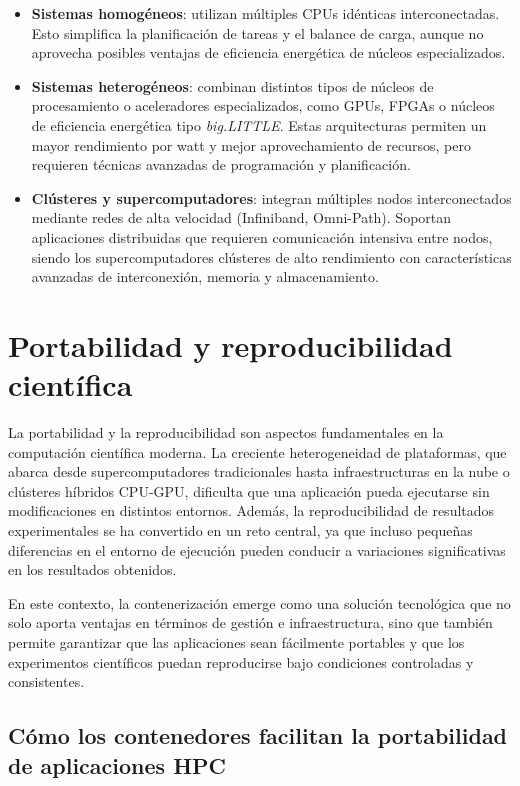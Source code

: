 \begin{itemize}
    \item \textbf{Sistemas homogéneos}: utilizan múltiples CPUs idénticas interconectadas. Esto simplifica la planificación de tareas y el balance de carga, aunque no aprovecha posibles ventajas de eficiencia energética de núcleos especializados.
    \item \textbf{Sistemas heterogéneos}: combinan distintos tipos de núcleos de procesamiento o aceleradores especializados, como GPUs, FPGAs o núcleos de eficiencia energética tipo \textit{big.LITTLE}. Estas arquitecturas permiten un mayor rendimiento por watt y mejor aprovechamiento de recursos, pero requieren técnicas avanzadas de programación y planificación.
    \item \textbf{Clústeres y supercomputadores}: integran múltiples nodos interconectados mediante redes de alta velocidad (Infiniband, Omni-Path). Soportan aplicaciones distribuidas que requieren comunicación intensiva entre nodos, siendo los supercomputadores clústeres de alto rendimiento con características avanzadas de interconexión, memoria y almacenamiento.
\end{itemize}

\section{Portabilidad y reproducibilidad científica}\label{sec:portabilidad_reproducibilidad}

La portabilidad y la reproducibilidad son aspectos fundamentales en la computación científica moderna. La creciente heterogeneidad de plataformas, que abarca desde supercomputadores tradicionales hasta infraestructuras en la nube o clústeres híbridos CPU-GPU, dificulta que una aplicación pueda ejecutarse sin modificaciones en distintos entornos. Además, la reproducibilidad de resultados experimentales se ha convertido en un reto central, ya que incluso pequeñas diferencias en el entorno de ejecución pueden conducir a variaciones significativas en los resultados obtenidos.

En este contexto, la contenerización emerge como una solución tecnológica que no solo aporta ventajas en términos de gestión e infraestructura, sino que también permite garantizar que las aplicaciones sean fácilmente portables y que los experimentos científicos puedan reproducirse bajo condiciones controladas y consistentes.

\subsection{Cómo los contenedores facilitan la portabilidad de aplicaciones \acs{HPC}}


